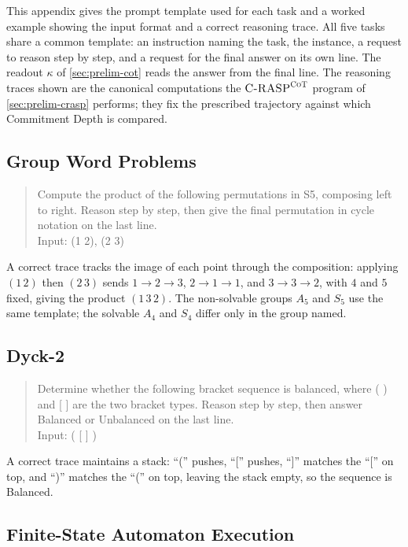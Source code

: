 \documentclass[11pt]{article}
\newcommand{\CRASPCoT}{\textsc{C-RASP}^{\textsc{CoT}}}
\begin{document}
This appendix gives the prompt template used for each task and a worked example
showing the input format and a correct reasoning trace. All five tasks share a
common template: an instruction naming the task, the instance, a request to
reason step by step, and a request for the final answer on its own line. The
readout $\kappa$ of \cref{sec:prelim-cot} reads the answer from the final line.
The reasoning traces shown are the canonical computations the $\CRASPCoT$
program of \cref{sec:prelim-crasp} performs; they fix the prescribed trajectory
against which Commitment Depth is compared.

\subsection{Group Word Problems}
\label{app:prompts-group}

\begin{quote}\small\ttfamily
Compute the product of the following permutations in S5, composing left to
right. Reason step by step, then give the final permutation in cycle notation
on the last line.\\[2pt]
Input: (1 2), (2 3)
\end{quote}

\noindent A correct trace tracks the image of each point through the
composition: applying $(1\,2)$ then $(2\,3)$ sends $1\!\to\!2\!\to\!3$,
$2\!\to\!1\!\to\!1$, and $3\!\to\!3\!\to\!2$, with $4$ and $5$ fixed, giving the
product $(1\,3\,2)$. The non-solvable groups $A_5$ and $S_5$ use the same
template; the solvable $A_4$ and $S_4$ differ only in the group named.

\subsection{Dyck-2}
\label{app:prompts-dyck}

\begin{quote}\small\ttfamily
Determine whether the following bracket sequence is balanced, where ( ) and [ ]
are the two bracket types. Reason step by step, then answer Balanced or
Unbalanced on the last line.\\[2pt]
Input: ( [ ] )
\end{quote}

\noindent A correct trace maintains a stack: ``('' pushes, ``['' pushes, ``]''
matches the ``['' on top, and ``)'' matches the ``('' on top, leaving the stack
empty, so the sequence is Balanced.

\subsection{Finite-State Automaton Execution}
\label{app:prompts-fsa}
\end{document}
